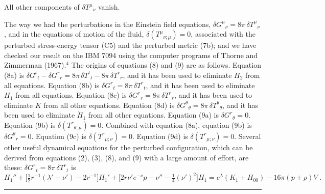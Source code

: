 All other components of $\delta T^{\mu}{}_{\nu}$ vanish.

The way we had the perturbations in the Einstein field equations,
$\delta G^{\mu}{}_{\nu} = 8\pi\,\delta T^{\mu}{}_{\nu}$,
and in the equations of motion of the fluid,
$\delta(T^{\mu}{}_{\nu;\mu}) = 0$, associated with the perturbed
stress-energy tensor (C5) and the perturbed metric (7b); and we have checked our result on the
IBM 7094 using the computer programs of Thorne and Zimmerman (1967).$^{4}$
The origins of equations (8) and (9) are as follows.
Equation (8a) is $\delta G^{t}{}_{t} - \delta G^{r}{}_{r} = 8\pi\,\delta T^{t}{}_{t} - 8\pi\,\delta T^{r}{}_{r}$,
and it has been used to eliminate $H_{2}$ from all equations.
Equation (8b) is $\delta G^{r}{}_{t} = 8\pi\,\delta T^{r}{}_{t}$,
and it has been used to eliminate $H_{1}$ from all equations.
Equation (8c) is $\delta G^{r}{}_{r} = 8\pi\,\delta T^{r}{}_{r}$,
and it has been used to eliminate $\dot{K}$ from all other equations.
Equation (8d) is $\delta G^{\theta}{}_{\theta} = 8\pi\,\delta T^{\theta}{}_{\theta}$,
and it has been used to eliminate $\dot{H}_{1}$ from all other equations.
Equation (9a) is $\delta G^{r}{}_{\theta} = 0$.
Equation (9b) is $\delta(T^{r}{}_{\theta;\mu}) = 0$.
Combined with equation (8a), equation (9b) is $\delta G^{\theta}{}_{r} = 0$.
Equation (9c) is $\delta(T^{r}{}_{\mu;\nu}) = 0$.
Equation (9d) is $\delta(T^{r}{}_{\mu;\nu}) = 0$.
Several other useful dynamical equations for the perturbed configuration, which can be
derived from equations (2), (3), (8), and (9) with a large amount of effort, are these:
$\delta G^{r}{}_{t} = 8\pi\,\delta T^{r}{}_{t}$ is
\begin{equation}
H_{1}'' + \bigl[\tfrac{1}{2}r^{-1}(\lambda' - \nu') - 2r^{-1}\bigr]H_{1}'
  + \bigl[2r\nu' e^{-\nu} p - \nu'' - \tfrac{1}{4}(\nu')^{2}\bigr]H_{1}
  = e^{\lambda}(K_{1} + H_{00}) - 16\pi(p+\rho)V \;.
\tag{C6}
\end{equation}

\bigskip
\noindent\rule{0.4\textwidth}{0.4pt}


